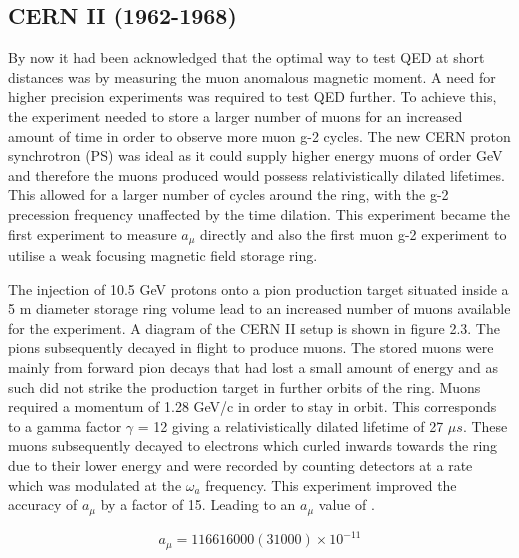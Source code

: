 \subsection{CERN II (1962-1968)}

By now it had been acknowledged that the optimal way to test QED at short distances was by measuring the muon anomalous magnetic moment. A need for higher precision experiments was required to test QED further. To achieve this, the experiment needed to store a larger number of muons for an increased amount of time in order to observe more muon g-2 cycles. The new CERN proton synchrotron (PS) was ideal as it could supply higher energy muons of order GeV and therefore the muons produced would possess relativistically dilated lifetimes. This allowed for a larger number of cycles around the ring, with the g-2 precession frequency unaffected by the time dilation. This experiment became the first experiment to measure $a_{\mu}$ directly and also the first muon g-2 experiment to utilise a weak focusing magnetic field storage ring.

The injection of 10.5 GeV protons onto a pion production target situated inside a 5 m diameter storage ring volume lead to an increased number of muons available for the experiment. A diagram of the CERN II setup is shown in figure 2.3. The pions subsequently decayed in flight to produce muons. The stored muons were mainly from forward pion decays that had lost a small amount of energy and as such did not strike the production target in further orbits of the ring.
Muons required a momentum of 1.28 GeV/c in order to stay in orbit. This corresponds to a gamma factor $\gamma$ = 12 giving a relativistically dilated lifetime of 27 $\mu{s}$. These muons subsequently decayed to electrons which curled inwards towards the ring due to their lower energy and were recorded by counting detectors at a rate which was modulated at the $\omega_{a}$ frequency. This experiment improved the accuracy of $a_{\mu}$ by a factor of 15. Leading to an $a_{\mu}$ value of \cite{Reference10}\cite{Reference12}.

\begin{equation}
a_{\mu} = 116616000(31000){\times}10^{-11}
\end{equation}


